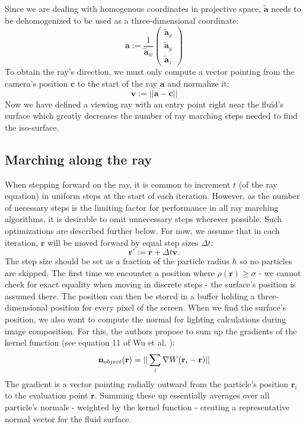 Since we are dealing with homogenous coordinates in projective space, $\tilde{\textbf{a}}$ needs to be dehomogenized to be used as a three-dimensional coordinate:
\[
\textbf{a} := \frac{1}{\tilde{\textbf{a}}_w}
\begin{pmatrix}
\tilde{\textbf{a}}_x \\
\tilde{\textbf{a}}_y \\
\tilde{\textbf{a}}_z
\end{pmatrix}
\]
To obtain the ray's direction, we must only compute a vector pointing from the camera's position $\textbf{c}$ to the start of the ray $\textbf{a}$ and normalize it:
$$\textbf{v} := || \textbf{a} - \textbf{c} ||$$
Now we have defined a viewing ray with an entry point right near the fluid's surface which greatly decreases the number of ray marching steps needed to find the iso-surface.

\subsection{Marching along the ray}

When stepping forward on the ray, it is common to increment $t$ (of the ray equation) in uniform steps at the start of each iteration. However, as the number of necessary steps is the limiting factor for performance in all ray marching algorithms, it is desirable to omit unnecessary steps wherever possible. Such optimizations are described further below. For now, we assume that in each iteration, $\textbf{r}$ will be moved forward by equal step sizes $\Delta t$:
\[ \textbf{r}' := \textbf{r} + \Delta t \textbf{v}. \]
The step size should be set as a fraction of the particle radius $h$ so no particles are skipped. The first time we encounter a position where $\rho(\textbf{r}) \geq \sigma$ - we cannot check for exact equality when moving in discrete steps - the surface's position is assumed there. The position can then be stored in a buffer holding a three-dimensional position for every pixel of the screen. When we find the surface's position, we also want to compute the normal for lighting calculations during image composition. For this, the authors propose to sum up the gradients of the kernel function (see equation 11 of Wu et al. \cite{Wu:2022}):
\[
\textbf{n}_{object}(\textbf{r}) = || \space \sum_i \nabla W(\textbf{r}_i - \textbf{r}) \space ||
\]
The gradient is a vector pointing radially outward from the particle's position $\textbf{r}_i$ to the evaluation point $\textbf{r}$. Summing these up essentially averages over all particle's normals - weighted by the kernel function - creating a representative normal vector for the fluid surface.

